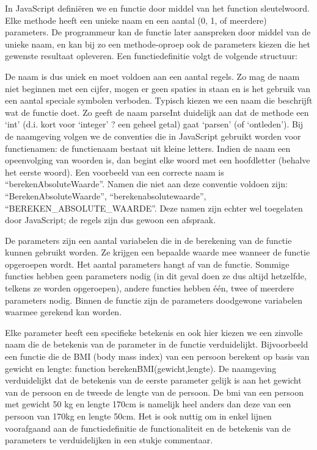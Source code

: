 In JavaScript defini\"eren we en functie door middel van het function sleutelwoord. Elke methode heeft een unieke naam en een aantal (0, 1, of meerdere) parameters. De programmeur kan de functie later aanspreken door middel van de unieke naam, en kan bij zo een methode-oproep ook de parameters kiezen die het gewenste resultaat opleveren. Een functiedefinitie volgt de volgende structuur:


De naam is dus uniek en moet voldoen aan een aantal regels. Zo mag de naam niet beginnen met een cijfer, mogen er geen spaties in staan en is het gebruik van een aantal speciale symbolen verboden. Typisch kiezen we een naam die beschrijft wat de functie doet. Zo geeft de naam parseInt duidelijk aan dat de methode een `int' (d.i. kort voor `integer'  ?  een geheel getal) gaat `parsen' (of `ontleden'). Bij de naamgeving volgen we de conventies die in JavaScript gebruikt worden voor functienamen: de functienaam bestaat uit kleine letters. Indien de naam een opeenvolging van woorden is, dan begint elke woord met een hoofdletter (behalve het eerste woord). Een voorbeeld van een correcte naam is ``berekenAbsoluteWaarde''. Namen die niet aan deze conventie voldoen zijn: ``BerekenAbsoluteWaarde'', ``berekenabsolutewaarde'', ``BEREKEN\_ABSOLUTE\_WAARDE''. Deze namen zijn echter wel toegelaten door JavaScript; de regels zijn dus gewoon een afspraak.

De parameters zijn een aantal variabelen die in de berekening van de functie kunnen gebruikt worden. Ze krijgen een bepaalde waarde mee wanneer de functie opgeroepen wordt. Het aantal parameters hangt af van de functie. Sommige functies hebben geen parameters nodig (in dit geval doen ze dus altijd hetzelfde, telkens ze worden opgeroepen), andere functies hebben \'e\'en, twee of meerdere parameters nodig. Binnen de functie zijn de parameters doodgewone variabelen waarmee gerekend kan worden.

Elke parameter heeft een specifieke betekenis en ook hier kiezen we een zinvolle naam die de betekenis van de parameter in de functie verduidelijkt. Bijvoorbeeld een functie die de BMI (body mass index) van een persoon berekent op basis van gewicht en lengte: function berekenBMI(gewicht,lengte). De naamgeving verduidelijkt dat de betekenis van de eerste parameter gelijk is aan het gewicht van de persoon en de tweede de lengte van de persoon.  De bmi van een persoon met gewicht 50 kg en lengte 170cm is namelijk heel anders dan deze van een persoon van 170kg en lengte 50cm.  Het is ook nuttig om in enkel lijnen voorafgaand aan de functiedefinitie de functionaliteit en de betekenis van de parameters  te  verduidelijken in een stukje commentaar.

